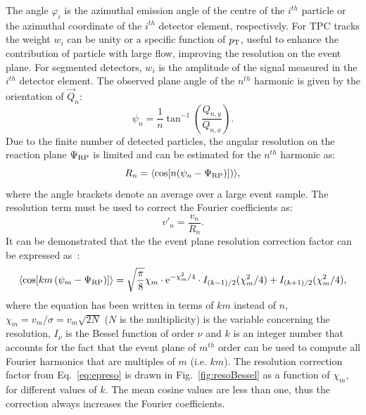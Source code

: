 The angle $\varphi_i$ is the azimuthal emission angle of the centre of the $i^{th}$ particle or the 
azimuthal coordinate of the $i^{th}$ detector element, respectively. 
For TPC tracks the weight $w_i$ can be unity or a specific 
function of $p_{\rm T}$, useful to enhance the 
contribution of particle with large flow, improving 
the resolution on the event plane. For segmented detectors, $w_i$ is the amplitude of the 
signal measured in the $i^{th}$ detector element. The observed plane 
angle of the $n^{th}$ harmonic is given by the orientation of $\vec{Q}_n$:
\begin{equation}
\psi_n = \dfrac{1}{n} \tan^{-1} \left(\dfrac{Q_{n,y}}{Q_{n,x}}\right).
\end{equation}
Due to the finite number of detected particles, the
angular resolution on the reaction plane $\Psi_{\rm RP}$ is limited and 
can be estimated for the $n^{th}$ harmonic as:
\begin{equation}
R_n = \langle {\rm cos}[n({\rm \psi}_n-{\rm \Psi}_{\rm RP})]) \rangle ,
\end{equation}
where the angle brackets denote an average over a large event sample.
The resolution term must be used to correct the Fourier coefficients as:
\begin{equation}
v'_n = \frac{v_n}{R_n}.
\end{equation}
It can be demonstrated that the the event plane resolution correction factor
can be expressed as~\cite{Poskanzer:1998yz}:
\begin{equation}
\label{eq:epreso}
\left\langle \cos [km\left( \psi_m-\Psi_{\rm RP}\right)]\right\rangle = \sqrt{\dfrac{\pi }{8}} \chi_m \cdot {\rm e}^{-\chi_m^2/4} \cdot I_{(k-1)/2}(\chi_m^2/4)+I_{(k+1)/2}(\chi_m^2/4),
\end{equation}
where the equation has been written in terms of $km$ 
instead of $n$, $\chi_m= v_m/\sigma = v_m\sqrt{2N}$ ($N$ is the multiplicity) is the variable concerning the
resolution, $I_\nu$ is the Bessel function of order $\nu$ and
$k$ is an integer number that accounts for the fact that the 
event plane of $m^{th}$ order can be used to compute all Fourier harmonics that are multiples
of $m$ (i.e. $km$). The resolution correction factor from Eq.~\ref{eq:epreso} is
drawn in Fig.~\ref{fig:resoBessel} as a function of $\chi_m$, for 
different values of $k$. 
The mean cosine values are less than one, thus the 
correction always increases the Fourier coefficients.
